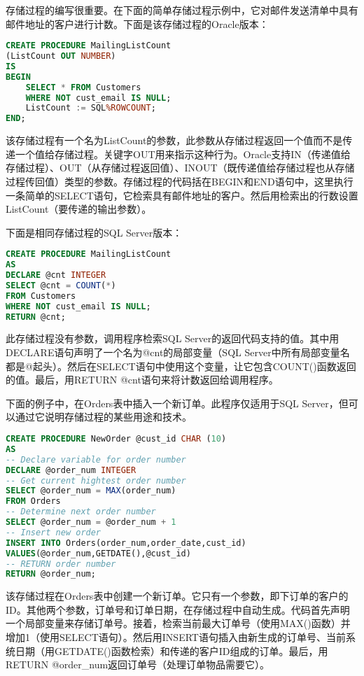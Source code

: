 存储过程的编写很重要。在下面的简单存储过程示例中，它对邮件发送清单中具有邮件地址的客户进行计数。下面是该存储过程的Oracle版本：

\begin{lstlisting}[language=SQL]
CREATE PROCEDURE MailingListCount
(ListCount OUT NUMBER)
IS
BEGIN
	SELECT * FROM Customers
	WHERE NOT cust_email IS NULL;
	ListCount := SQL%ROWCOUNT;
END;
\end{lstlisting}


该存储过程有一个名为ListCount的参数，此参数从存储过程返回一个值而不是传递一个值给存储过程。关键字OUT用来指示这种行为。Oracle支持IN（传递值给存储过程）、OUT（从存储过程返回值）、INOUT（既传递值给存储过程也从存储过程传回值）类型的参数。存储过程的代码括在BEGIN和END语句中，这里执行一条简单的SELECT语句，它检索具有邮件地址的客户。然后用检索出的行数设置ListCount（要传递的输出参数）。


下面是相同存储过程的SQL Server版本：

\begin{lstlisting}[language=SQL]
CREATE PROCEDURE MailingListCount
AS
DECLARE @cnt INTEGER
SELECT @cnt = COUNT(*)
FROM Customers
WHERE NOT cust_email IS NULL;
RETURN @cnt;
\end{lstlisting}

此存储过程没有参数，调用程序检索SQL Server的返回代码支持的值。其中用DECLARE语句声明了一个名为@cnt的局部变量（SQL Server中所有局部变量名都是@起头）。然后在SELECT语句中使用这个变量，让它包含COUNT()函数返回的值。最后，用RETURN @cnt语句来将计数返回给调用程序。

下面的例子中，在Orders表中插入一个新订单。此程序仅适用于SQL Server，但可以通过它说明存储过程的某些用途和技术。

\begin{lstlisting}[language=SQL]
CREATE PROCEDURE NewOrder @cust_id CHAR (10)
AS
-- Declare variable for order number
DECLARE @order_num INTEGER
-- Get current hightest order number
SELECT @order_num = MAX(order_num)
FROM Orders
-- Determine next order number
SELECT @order_num = @order_num + 1
-- Insert new order
INSERT INTO Orders(order_num,order_date,cust_id)
VALUES(@order_num,GETDATE(),@cust_id)
-- RETURN order number
RETURN @order_num;
\end{lstlisting}

该存储过程在Orders表中创建一个新订单。它只有一个参数，即下订单的客户的ID。其他两个参数，订单号和订单日期，在存储过程中自动生成。代码首先声明一个局部变量来存储订单号。接着，检索当前最大订单号（使用MAX()函数）并增加1（使用SELECT语句）。然后用INSERT语句插入由新生成的订单号、当前系统日期（用GETDATE()函数检索）和传递的客户ID组成的订单。最后，用RETURN @order\_num返回订单号（处理订单物品需要它）。


